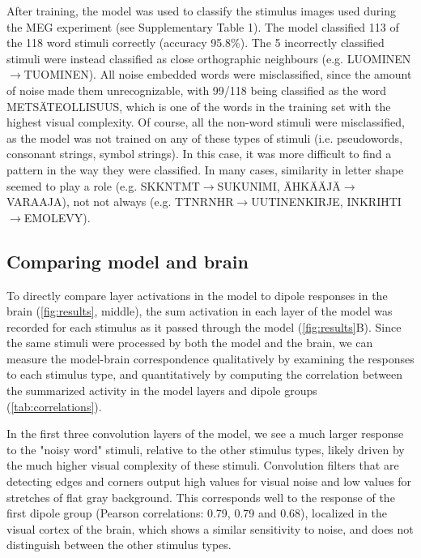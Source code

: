 \documentclass[a4paper, 10pt]{vanvliet_paper}
\begin{document}
After training, the model was used to classify the stimulus images used during the \gls{MEG} experiment (see Supplementary Table 1).
The model classified 113 of the 118 word stimuli correctly (accuracy 95.8\%).
The 5 incorrectly classified stimuli were instead classified as close orthographic neighbours (e.g. LUOMINEN$\rightarrow$TUOMINEN).
All noise embedded words were misclassified, since the amount of noise made them unrecognizable, with 99/118 being classified as the word METSÄTEOLLISUUS, which is one of the words in the training set with the highest visual complexity.
Of course, all the non-word stimuli were misclassified, as the model was not trained on any of these types of stimuli (i.e. pseudowords, consonant strings, symbol strings).
In this case, it was more difficult to find a pattern in the way they were classified.
In many cases, similarity in letter shape seemed to play a role (e.g. SKKNTMT$\rightarrow$SUKUNIMI, ÄHKÄÄJÄ$\rightarrow$VARAAJA), not not always (e.g. TTNRNHR$\rightarrow$UUTINENKIRJE, INKRIHTI$\rightarrow$EMOLEVY).


\subsection{Comparing model and brain}

To directly compare layer activations in the model to dipole responses in the brain (\autoref{fig:results}, middle), the sum activation in each layer of the model was recorded for each stimulus as it passed through the model (\autoref{fig:results}B).
Since the same stimuli were processed by both the model and the brain, we can measure the model-brain correspondence qualitatively by examining the responses to each stimulus type, and quantitatively by computing the correlation between the summarized activity in the model layers and dipole groups (\autoref{tab:correlations}).

In the first three convolution layers of the model, we see a much larger response to the "noisy word" stimuli, relative to the other stimulus types, likely driven by the much higher visual complexity of these stimuli.
Convolution filters that are detecting edges and corners output high values for visual noise and low values for stretches of flat gray background.
This corresponds well to the response of the first dipole group (Pearson correlations: 0.79, 0.79 and 0.68), localized in the visual cortex of the brain, which shows a similar sensitivity to noise, and does not distinguish between the other stimulus types.
\end{document}
